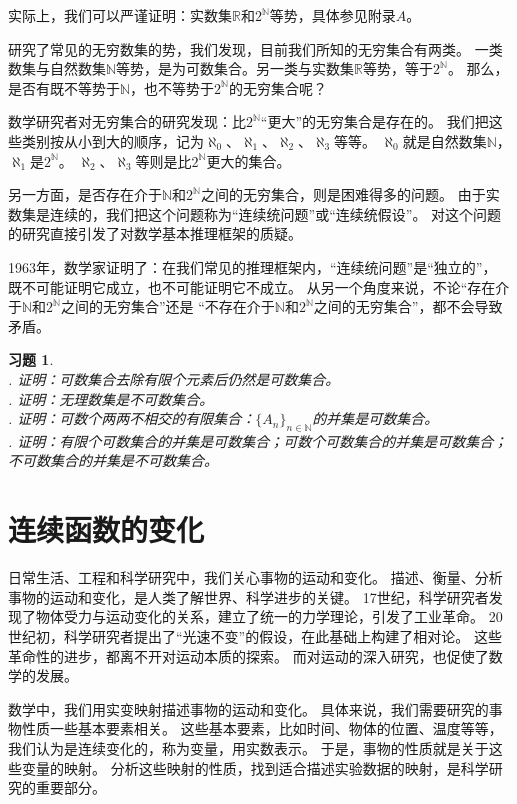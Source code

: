 \documentclass[12pt,UTF8]{ctexbook}
\newtheorem{xt}{习题}[section]
\begin{document}
实际上，我们可以严谨证明：实数集$\mathbb{R}$和$2^\mathbb{N}$等势，具体参见附录$A$。

研究了常见的无穷数集的势，我们发现，目前我们所知的无穷集合有两类。
一类数集与自然数集$\mathbb{N}$等势，是为可数集合。另一类与实数集$\mathbb{R}$等势，等于$2^\mathbb{N}$。
那么，是否有既不等势于$\mathbb{N}$，也不等势于$2^\mathbb{N}$的无穷集合呢？

数学研究者对无穷集合的研究发现：比$2^\mathbb{N}$“更大”的无穷集合是存在的。
我们把这些类别按从小到大的顺序，记为$\aleph_0$、$\aleph_1$、$\aleph_2$、$\aleph_3$等等。
$\aleph_0$就是自然数集$\mathbb{N}$，$\aleph_1$是$2^\mathbb{N}$。
$\aleph_2$、$\aleph_3$等则是比$2^\mathbb{N}$更大的集合。

另一方面，是否存在介于$\mathbb{N}$和$2^\mathbb{N}$之间的无穷集合，则是困难得多的问题。
由于实数集是连续的，我们把这个问题称为“连续统问题”或“连续统假设”。
对这个问题的研究直接引发了对数学基本推理框架的质疑。

1963年，数学家证明了：在我们常见的推理框架内，“连续统问题”是“独立的”，
既不可能证明它成立，也不可能证明它不成立。
从另一个角度来说，不论“存在介于$\mathbb{N}$和$2^\mathbb{N}$之间的无穷集合”还是
“不存在介于$\mathbb{N}$和$2^\mathbb{N}$之间的无穷集合”，都不会导致矛盾。

\begin{xt}
    \mbox{} \\
    . 证明：可数集合去除有限个元素后仍然是可数集合。\\
    . 证明：无理数集是不可数集合。\\
    . 证明：可数个两两不相交的有限集合：$\{A_n\}_{n\in\mathbb{N}}$的并集是可数集合。\\
    . 证明：有限个可数集合的并集是可数集合；可数个可数集合的并集是可数集合；不可数集合的并集是不可数集合。
\end{xt}

\chapter{连续函数的变化}

日常生活、工程和科学研究中，我们关心事物的运动和变化。
描述、衡量、分析事物的运动和变化，是人类了解世界、科学进步的关键。
17世纪，科学研究者发现了物体受力与运动变化的关系，建立了统一的力学理论，引发了工业革命。
20世纪初，科学研究者提出了“光速不变”的假设，在此基础上构建了相对论。
这些革命性的进步，都离不开对运动本质的探索。
而对运动的深入研究，也促使了数学的发展。

数学中，我们用实变映射描述事物的运动和变化。
具体来说，我们需要研究的事物性质一些基本要素相关。
这些基本要素，比如时间、物体的位置、温度等等，我们认为是连续变化的，称为变量，用实数表示。
于是，事物的性质就是关于这些变量的映射。
分析这些映射的性质，找到适合描述实验数据的映射，是科学研究的重要部分。
\end{document}
